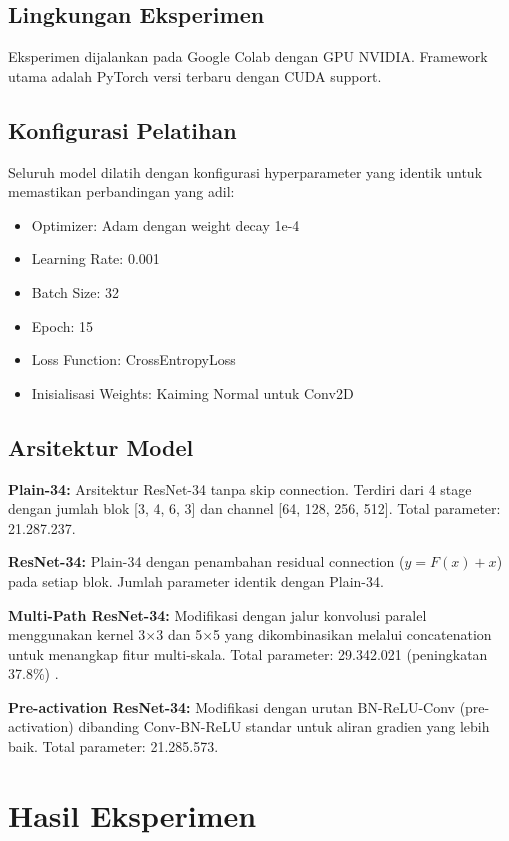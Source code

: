 \documentclass[11pt,a4paper]{article}
\begin{document}
\subsection{Lingkungan Eksperimen}
Eksperimen dijalankan pada Google Colab dengan GPU NVIDIA. Framework utama adalah PyTorch versi terbaru dengan CUDA support. 

\subsection{Konfigurasi Pelatihan}
Seluruh model dilatih dengan konfigurasi hyperparameter yang identik untuk memastikan perbandingan yang adil:
\begin{itemize}
    \item Optimizer: Adam dengan weight decay 1e-4
    \item Learning Rate: 0.001
    \item Batch Size: 32
    \item Epoch: 15
    \item Loss Function: CrossEntropyLoss
    \item Inisialisasi Weights: Kaiming Normal untuk Conv2D
\end{itemize}

\subsection{Arsitektur Model}

\textbf{Plain-34:} Arsitektur ResNet-34 tanpa skip connection. Terdiri dari 4 stage dengan jumlah blok [3, 4, 6, 3] dan channel [64, 128, 256, 512]. Total parameter: 21.287.237.

\textbf{ResNet-34:} Plain-34 dengan penambahan residual connection ($y = F(x) + x$) pada setiap blok. Jumlah parameter identik dengan Plain-34.

\textbf{Multi-Path ResNet-34:} Modifikasi dengan jalur konvolusi paralel menggunakan kernel 3$\times$3 dan 5$\times$5 yang dikombinasikan melalui concatenation untuk menangkap fitur multi-skala. Total parameter: 29.342.021 (peningkatan 37.8\%) \cite{Ding_2022}.

\textbf{Pre-activation ResNet-34:} Modifikasi dengan urutan BN-ReLU-Conv (pre-activation) dibanding Conv-BN-ReLU standar untuk aliran gradien yang lebih baik. Total parameter: 21.285.573.

\section{Hasil Eksperimen}
\end{document}
